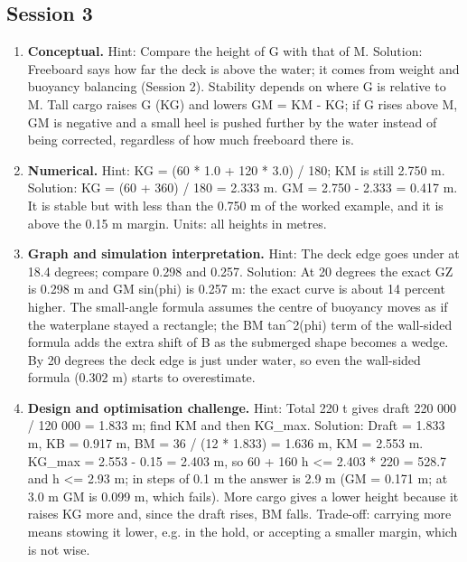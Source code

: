 \documentclass[11pt,a4paper]{article}
\begin{document}
\subsection*{Session 3}
\begin{enumerate}[nosep]
\item \textbf{Conceptual.} Hint: Compare the height of G with that of M. Solution: Freeboard says how far the deck is above the water; it comes from weight and buoyancy balancing (Session 2). Stability depends on where G is relative to M. Tall cargo raises G (KG) and lowers GM = KM - KG; if G rises above M, GM is negative and a small heel is pushed further by the water instead of being corrected, regardless of how much freeboard there is.
\item \textbf{Numerical.} Hint: KG = (60 * 1.0 + 120 * 3.0) / 180; KM is still 2.750 m. Solution: KG = (60 + 360) / 180 = 2.333 m. GM = 2.750 - 2.333 = 0.417 m. It is stable but with less than the 0.750 m of the worked example, and it is above the 0.15 m margin. Units: all heights in metres.
\item \textbf{Graph and simulation interpretation.} Hint: The deck edge goes under at 18.4 degrees; compare 0.298 and 0.257. Solution: At 20 degrees the exact GZ is 0.298 m and GM sin(phi) is 0.257 m: the exact curve is about 14 percent higher. The small-angle formula assumes the centre of buoyancy moves as if the waterplane stayed a rectangle; the BM tan\textasciicircum{}2(phi) term of the wall-sided formula adds the extra shift of B as the submerged shape becomes a wedge. By 20 degrees the deck edge is just under water, so even the wall-sided formula (0.302 m) starts to overestimate.
\item \textbf{Design and optimisation challenge.} Hint: Total 220 t gives draft 220 000 / 120 000 = 1.833 m; find KM and then KG\_max. Solution: Draft = 1.833 m, KB = 0.917 m, BM = 36 / (12 * 1.833) = 1.636 m, KM = 2.553 m. KG\_max = 2.553 - 0.15 = 2.403 m, so 60 + 160 h \textless{}= 2.403 * 220 = 528.7 and h \textless{}= 2.93 m; in steps of 0.1 m the answer is 2.9 m (GM = 0.171 m; at 3.0 m GM is 0.099 m, which fails). More cargo gives a lower height because it raises KG more and, since the draft rises, BM falls. Trade-off: carrying more means stowing it lower, e.g. in the hold, or accepting a smaller margin, which is not wise.
\end{enumerate}
\end{document}
